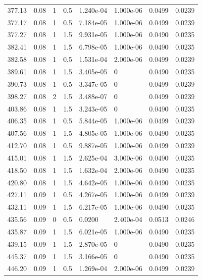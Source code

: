 \documentclass[preview]{standalone}
\begin{document}
{{{\begin{tabular}{L{1.2cm}C{1.2cm} C{0.3cm}C{0.5cm} C{1.4cm}C{1.4cm} C{1.4cm}C{1.4cm}}
  377.13  &  0.08  & 1     & 0.5 &  1.240e-04  & 1.000e-06  & 0.0499 &  0.0239   \\ 
  377.17  &  0.08  & 1     & 0.5 &  7.184e-05  & 1.000e-06  & 0.0499 &  0.0239   \\ 
  377.27  &  0.08  & 1     & 1.5 &  9.931e-05  & 1.000e-06  & 0.0490 &  0.0235   \\ 
  382.41  &  0.08  & 1     & 1.5 &  6.798e-05  & 1.000e-06  & 0.0490 &  0.0235   \\ 
  382.58  &  0.08  & 1     & 0.5 &  1.531e-04  & 2.000e-06  & 0.0499 &  0.0239   \\ 
  389.61  &  0.08  & 1     & 1.5 &  3.405e-05  & 0  & 0.0490 &  0.0235   \\ 
  390.73  &  0.08  & 1     & 0.5 &  3.347e-05  & 0  & 0.0499 &  0.0239   \\ 
  398.27  &  0.08  & 2     & 1.5 &  3.488e-07  & 0  & 0.0499 &  0.0239   \\ 
  403.86  &  0.08  & 1     & 1.5 &  3.243e-05  & 0  & 0.0490 &  0.0235   \\ 
  406.35  &  0.08  & 1     & 0.5 &  5.844e-05  & 1.000e-06  & 0.0499 &  0.0239   \\ 
  407.56  &  0.08  & 1     & 1.5 &  4.805e-05  & 1.000e-06  & 0.0490 &  0.0235   \\ 
  412.70  &  0.08  & 1     & 0.5 &  9.887e-05  & 1.000e-06  & 0.0499 &  0.0239   \\ 
  415.01  &  0.08  & 1     & 1.5 &  2.625e-04  & 3.000e-06  & 0.0490 &  0.0235   \\ 
  418.50  &  0.08  & 1     & 1.5 &  1.632e-04  & 2.000e-06  & 0.0490 &  0.0235   \\ 
  420.80  &  0.08  & 1     & 1.5 &  4.642e-05  & 1.000e-06  & 0.0490 &  0.0235   \\ 
  427.11  &  0.09  & 1     & 0.5 &  4.267e-05  & 1.000e-06  & 0.0499 &  0.0239   \\ 
  432.11  &  0.09  & 1     & 1.5 &  6.217e-05  & 1.000e-06  & 0.0490 &  0.0235   \\ 
  435.56  &  0.09  & 0     & 0.5 &  0.0200  & 2.400e-04  & 0.0513 &  0.0246   \\ 
  435.87  &  0.09  & 1     & 1.5 &  6.021e-05  & 1.000e-06  & 0.0490 &  0.0235   \\ 
  439.15  &  0.09  & 1     & 1.5 &  2.870e-05  & 0  & 0.0490 &  0.0235   \\ 
  445.37  &  0.09  & 1     & 1.5 &  3.166e-05  & 0  & 0.0490 &  0.0235   \\ 
  446.20  &  0.09  & 1     & 0.5 &  1.269e-04  & 2.000e-06  & 0.0499 &  0.0239   \\ 

\end{tabular}}}}
\end{document}
